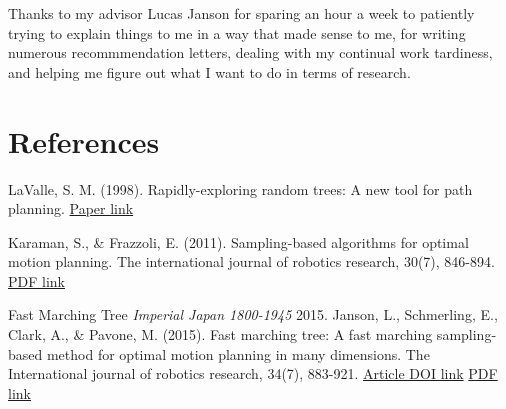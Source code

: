 \documentclass[a4paper]{article}
\begin{document}
Thanks to my advisor Lucas Janson for sparing an hour a week to patiently trying
to explain things to me in a way that made sense to me, for writing
numerous recommmendation letters, dealing with my continual work tardiness, and
helping me figure out what I want to do in terms of research.


\section{References}

\begin{thebibliography}{1}

        LaValle, S. M. (1998). Rapidly-exploring random trees: A new tool for
        path planning.
        \href{http://bloom.personalrobotics.ri.cmu.edu/files/courses/papers/Kavraki98-prm.pdf}{Paper link} 

        Karaman, S., & Frazzoli, E. (2011). Sampling-based algorithms for
        optimal motion planning. The international journal of robotics research,
        30(7), 846-894.
        \href{https://arxiv.org/pdf/1105.1186}{PDF link}


 Fast Marching Tree {\em Imperial Japan 1800-1945} 2015.
    Janson, L., Schmerling, E., Clark, A., & Pavone, M. (2015). Fast marching
        tree: A fast marching sampling-based method for optimal motion planning
        in many dimensions. The International journal of robotics research,
        34(7), 883-921.
        \href{http://journals.sagepub.com/doi/10.1177/0278364915577958}{Article
        DOI link} 
        \href{ https://arxiv.org/pdf/1306.3532.pdf}{PDF link}


\end{thebibliography}






\end{document}
